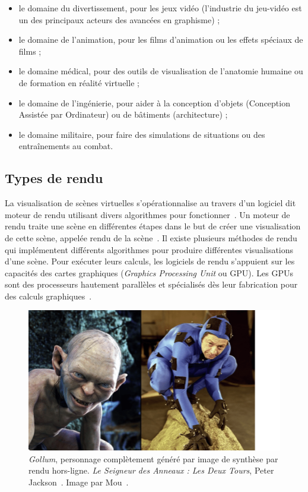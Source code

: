 \begin{itemize}
    \item le domaine du divertissement, pour les jeux vidéo (l'industrie du jeu-vidéo est un des principaux acteurs des avancées en graphisme) ;
    \item le domaine de l'animation, pour les films d'animation ou les effets spéciaux de films ;
    \item le domaine médical, pour des outils de visualisation de l'anatomie humaine ou de formation en réalité virtuelle ;
    \item le domaine de l'ingénierie, pour aider à la conception d'objets (Conception Assistée par Ordinateur) ou de bâtiments (architecture) ;
    \item le domaine militaire, pour faire des simulations de situations ou des entraînements au combat.
\end{itemize}

\subsection*{Types de rendu}

La visualisation de scènes virtuelles s'opérationnalise au travers d'un logiciel dit moteur de rendu utilisant divers algorithmes pour fonctionner~\cite{sherman_chapter_2003}. Un moteur de rendu traite une scène en différentes étapes dans le but de créer une visualisation de cette scène, appelée rendu de la scène~\cite{pharr_physically_2023}. Il existe plusieurs méthodes de rendu qui implémentent différents algorithmes pour produire différentes visualisations d'une scène. Pour exécuter leurs calculs, les logiciels de rendu s'appuient sur les capacités des cartes graphiques ({\it Graphics Processing Unit} ou GPU). Les GPUs sont des processeurs hautement parallèles et spécialisés dès leur fabrication pour des calculs graphiques~\cite{das_history_2016}.

\bigskip

\begin{figure}[h]
    \centering
    \includegraphics[width=.65\textwidth]{contenu/resources/images/gollum}
    \caption[{\it Gollum} (2002), {\it Le Seigneur des Anneaux : Les Deux Tours}]{{\it Gollum}, personnage complètement généré par image de synthèse par rendu hors-ligne. {\it Le Seigneur des Anneaux : Les Deux Tours}, Peter Jackson~\cite{jackson_lord_2002}. Image par Mou~\cite{mou_keyframe_2018}.}
    \label{fig:gollum}
\end{figure}

